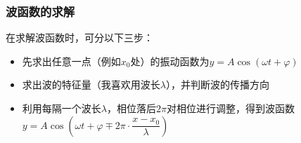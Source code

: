 
\subsubsection{波函数的求解}

在求解波函数时，可分以下三步：
\begin{itemize}
    \item 先求出任意一点（例如$x_0$处）的振动函数为$y=A\cos(\omega t+\varphi)$
    \item 求出波的特征量（我喜欢用波长$\lambda$），并判断波的传播方向
    \item 利用每隔一个波长$\lambda$，相位落后$2\pi$对相位进行调整，得到波函数$y=A\cos\left(\omega t+\varphi\mp 2\pi\cdot \dfrac{x-x_0}{\lambda}\right)$
\end{itemize}

